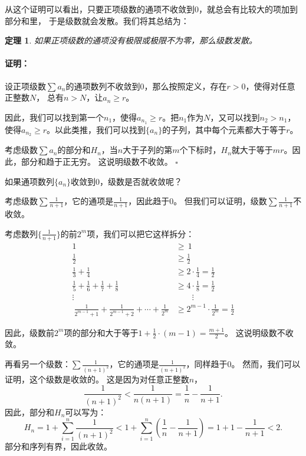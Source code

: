 \documentclass[12pt,UTF8]{ctexbook}
\renewenvironment{proof}{\paragraph{\textbf{证明：}}}{\hfill$\square$}
\newtheorem{tm}{定理}[section]
\begin{document}
从这个证明可以看出，只要正项级数的通项不收敛到$0$，就总会有比较大的项加到部分和里，
于是级数就会发散。我们将其总结为：
\begin{tm}
    如果正项级数的通项没有极限或极限不为零，那么级数发散。
\end{tm}
\begin{proof}
    设正项级数$\sum a_n$的通项数列不收敛到$0$，那么按照定义，存在$r>0$，使得对任意正整数$N$，
    总有$n > N$，让$a_n \geqslant r$。

    因此，我们可以找到第一个$n_1$，使得$a_{n_1} \geqslant r$。把$n_1$作为$N$，又可以找到$n_2 > n_1$，
    使得$a_{n_2} \geqslant r$。以此类推，我们可以找到$\{a_n\}$的子列，其中每个元素都大于等于$r$。

    考虑级数$\sum a_n$的部分和$H_n$，当$n$大于子列的第$m$个下标时，$H_n$就大于等于$mr$。因此，部分和趋于正无穷。
    这说明级数不收敛。
\end{proof}

如果通项数列$\{a_n\}$收敛到$0$，级数是否就收敛呢？

考虑级数$\sum \frac{1}{n+1}$，它的通项是$\frac{1}{n+1}$，因此趋于$0$。
但我们可以证明，级数$\sum \frac{1}{n+1}$不收敛。

考虑数列$\{\frac{1}{n+1}\}$的前$2^m$项，我们可以把它这样拆分：
\begin{align*}
    1 \, &\geqslant \, 1  \\
    \frac{1}{2} &\geqslant \frac{1}{2}  \\
    \frac{1}{3} + \frac{1}{4} &\geqslant 2 \cdot \frac{1}{4} = \frac{1}{2}  \\
    \frac{1}{5} + \frac{1}{6} + \frac{1}{7} + \frac{1}{8} &\geqslant 4 \cdot \frac{1}{8} = \frac{1}{2}  \\
    \vdots \qquad & \qquad \vdots  \\\
    \frac{1}{2^{m-1}+1} + \frac{1}{2^{m-1}+2} + \cdots + \frac{1}{2^{m}} &\geqslant 2^{m-1} \cdot \frac{1}{2^{m}} = \frac{1}{2}  
\end{align*}

因此，级数前$2^m$项的部分和大于等于$1 + \frac12 \cdot (m - 1) = \frac{m+1}{2}$。
这说明级数不收敛。

再看另一个级数：$\sum \frac{1}{(n+1)^2}$，它的通项是$\frac{1}{(n+1)^2}$，同样趋于$0$。
然而，我们可以证明，这个级数是收敛的。
这是因为对任意正整数$n$，
$$ \frac{1}{(n+1)^2} < \frac{1}{n(n+1)} = \frac{1}{n} - \frac{1}{n+1}.$$
因此，部分和$H_n$可以写为：
$$ H_n = 1 + \sum_{i=1}^n \frac{1}{(n+1)^2} < 1 + \sum_{i=1}^n \left(\frac{1}{n} - \frac{1}{n+1}\right) = 1 + 1 - \frac{1}{n+1} < 2. $$
部分和序列有界，因此收敛。
\end{document}
